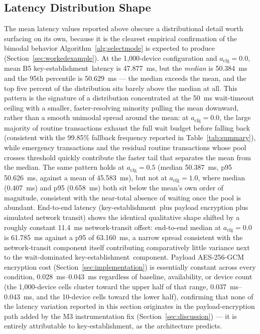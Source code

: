 \documentclass[journal]{IEEEtran}
\newcommand{\keyest}{key-establishment}
\newcommand{\acfg}{\ensuremath{a_{\text{cfg}}}}
\begin{document}
\subsection{Latency Distribution Shape}

The mean latency values reported above obscure a distributional detail worth surfacing on its own, because it is the clearest empirical confirmation of the bimodal behavior Algorithm~\ref{alg:selectmode} is expected to produce (Section~\ref{sec:workedexample}). At the 1{,}000-device configuration and $\acfg=0.0$, mean B5 \keyest\ latency is \qty{47.877}{ms}, but the \emph{median} is \qty{50.384}{ms} and the 95th percentile is \qty{50.629}{ms} --- the median exceeds the mean, and the top five percent of the distribution sits barely above the median at all. This pattern is the signature of a distribution concentrated at the \qty{50}{ms} wait-timeout ceiling with a smaller, faster-resolving minority pulling the mean downward, rather than a smooth unimodal spread around the mean: at $\acfg=0.0$, the large majority of routine transactions exhaust the full wait budget before falling back (consistent with the 99.85\% fallback frequency reported in Table~\ref{tab:summary}), while emergency transactions and the residual routine transactions whose pool crosses threshold quickly contribute the faster tail that separates the mean from the median. The same pattern holds at $\acfg=0.5$ (median \qty{50.387}{ms}, p95 \qty{50.626}{ms}, against a mean of \qty{45.583}{ms}), but not at $\acfg=1.0$, where median (\qty{0.407}{ms}) and p95 (\qty{0.658}{ms}) both sit below the mean's own order of magnitude, consistent with the near-total absence of waiting once the pool is abundant. End-to-end latency (\keyest\ plus payload encryption plus simulated network transit) shows the identical qualitative shape shifted by a roughly constant \qty{11.4}{ms} network-transit offset: end-to-end median at $\acfg=0.0$ is \qty{61.785}{ms} against a p95 of \qty{63.160}{ms}, a narrow spread consistent with the network-transit component itself contributing comparatively little variance next to the wait-dominated \keyest\ component. Payload AES-256-GCM encryption cost (Section~\ref{sec:implementation}) is essentially constant across every condition, \qty{0.028}{ms}--\qty{0.043}{ms} regardless of baseline, availability, or device count (the 1{,}000-device cells cluster toward the upper half of that range, \qty{0.037}{ms}--\qty{0.043}{ms}, and the 10-device cells toward the lower half), confirming that none of the latency variation reported in this section originates in the payload-encryption path added by the M3 instrumentation fix (Section~\ref{sec:discussion}) --- it is entirely attributable to \keyest, as the architecture predicts.
\end{document}
